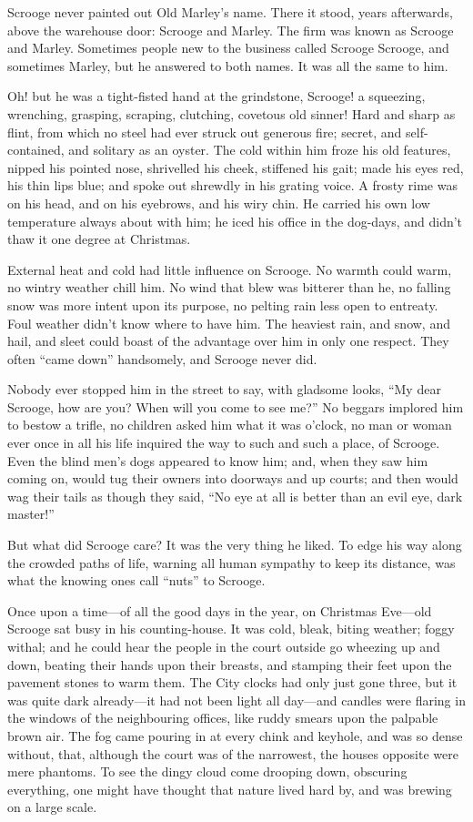 \documentclass[paper=a5,BCOR=15mm,twoside,DIV=15,headinclude=off,12pt,chapterprefix=off,openany,headings=huge]{scrbook} %
\begin{document}
Scrooge never painted out Old Marley's name. There it stood, years afterwards, above the warehouse door: Scrooge and Marley. The firm was known as Scrooge and Marley. Sometimes people new to the business called Scrooge Scrooge, and sometimes Marley, but he answered to both names. It was all the same to him.

Oh! but he was a tight-fisted hand at the grindstone, Scrooge! a squeezing, wrenching, grasping, scraping, clutching, covetous old sinner! Hard and sharp as flint, from which no steel had ever struck out generous fire; secret, and self-contained, and solitary as an oyster. The cold within him froze his old features, nipped his pointed nose, shrivelled his cheek, stiffened his gait; made his eyes red, his thin lips blue; and spoke out shrewdly in his grating voice. A frosty rime was on his head, and on his eyebrows, and his wiry chin. He carried his own low temperature always about with him; he iced his office in the dog-days, and didn't thaw it one degree at Christmas.

External heat and cold had little influence on Scrooge. No warmth could warm, no wintry weather chill him. No wind that blew was bitterer than he, no falling snow was more intent upon its purpose, no pelting rain less open to entreaty. Foul weather didn't know where to have him. The heaviest rain, and snow, and hail, and sleet could boast of the advantage over him in only one respect. They often \enquote{came down} handsomely, and Scrooge never did.

Nobody ever stopped him in the street to say, with gladsome looks, \enquote{My dear Scrooge, how are you? When will you come to see me?} No beggars implored him to bestow a trifle, no children asked him what it was o'clock, no man or woman ever once in all his life inquired the way to such and such a place, of Scrooge. Even the blind men's dogs appeared to know him; and, when they saw him coming on, would tug their owners into doorways and up courts; and then would wag their tails as though they said, \enquote{No eye at all is better than an evil eye, dark master!}

But what did Scrooge care? It was the very thing he liked. To edge his way along the crowded paths of life, warning all human sympathy to keep its distance, was what the knowing ones call \enquote{nuts} to Scrooge.

Once upon a time—of all the good days in the year, on Christmas Eve—old Scrooge sat busy in his counting-house. It was cold, bleak, biting weather; foggy withal; and he could hear the people in the court outside go wheezing up and down, beating their hands upon their breasts, and stamping their feet upon the pavement stones to warm them. The City clocks had only just gone three, but it was quite dark already—it had not been light all day—and candles were flaring in the windows of the neighbouring offices, like ruddy smears upon the palpable brown air. The fog came pouring in at every chink and keyhole, and was so dense without, that, although the court was of the narrowest, the houses opposite were mere phantoms. To see the dingy cloud come drooping down, obscuring everything, one might have thought that nature lived hard by, and was brewing on a large scale.
\end{document}
